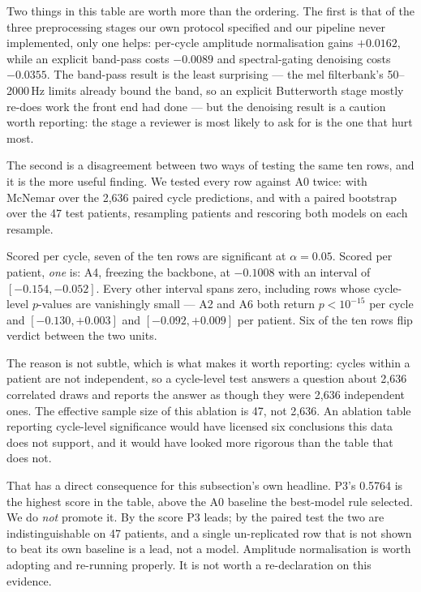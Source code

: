 \documentclass[journal,onecolumn]{IEEEtran}
\begin{document}
Two things in this table are worth more than the ordering. The first is that of the
three preprocessing stages our own protocol specified and our pipeline never implemented,
only one helps: per-cycle amplitude normalisation gains $+0.0162$, while an explicit
band-pass costs $-0.0089$ and spectral-gating denoising costs $-0.0355$. The band-pass
result is the least surprising --- the mel filterbank's 50--2000\,Hz limits already bound
the band, so an explicit Butterworth stage mostly re-does work the front end had done ---
but the denoising result is a caution worth reporting: the stage a reviewer is most likely
to ask for is the one that hurt most.

The second is a disagreement between two ways of testing the same ten rows, and it is
the more useful finding. We tested every row against A0 twice: with McNemar over the
2{,}636 paired cycle predictions, and with a paired bootstrap over the 47 test patients,
resampling patients and rescoring both models on each resample.

Scored per cycle, seven of the ten rows are significant at $\alpha = 0.05$. Scored per
patient, \emph{one} is: A4, freezing the backbone, at $-0.1008$ with an interval of
$[-0.154, -0.052]$. Every other interval spans zero, including rows whose cycle-level
$p$-values are vanishingly small --- A2 and A6 both return $p < 10^{-15}$ per cycle and
$[-0.130, +0.003]$ and $[-0.092, +0.009]$ per patient. Six of the ten rows flip verdict
between the two units.

The reason is not subtle, which is what makes it worth reporting: cycles within a patient
are not independent, so a cycle-level test answers a question about 2{,}636 correlated
draws and reports the answer as though they were 2{,}636 independent ones. The effective
sample size of this ablation is 47, not 2{,}636. An ablation table reporting cycle-level
significance would have licensed six conclusions this data does not support, and it would
have looked more rigorous than the table that does not.

That has a direct consequence for this subsection's own headline. P3's 0.5764 is the
highest score in the table, above the A0 baseline the best-model rule selected. We do
\emph{not} promote it. By the score P3 leads; by the paired test the two are
indistinguishable on 47 patients, and a single un-replicated row that is not shown to beat
its own baseline is a lead, not a model. Amplitude normalisation is worth adopting and
re-running properly. It is not worth a re-declaration on this evidence.
\end{document}
